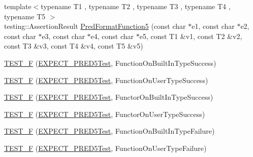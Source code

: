 \begin{DoxyCompactItemize}
{\footnotesize template$<$typename T1 , typename T2 , typename T3 , typename T4 , typename T5 $>$ }\\testing\+::\+Assertion\+Result \mbox{\hyperlink{googletest-master_2googletest_2test_2gtest__pred__impl__unittest_8cc_a09cbd3b6651151c3b97a890d28bdb75f}{Pred\+Format\+Function5}} (const char $\ast$e1, const char $\ast$e2, const char $\ast$e3, const char $\ast$e4, const char $\ast$e5, const T1 \&v1, const T2 \&v2, const T3 \&v3, const T4 \&v4, const T5 \&v5)
\item 
\mbox{\hyperlink{googletest-master_2googletest_2test_2gtest__pred__impl__unittest_8cc_a1b36f70a595ae4a209741df2a62002c3}{T\+E\+S\+T\+\_\+F}} (\mbox{\hyperlink{googletest-master_2googletest_2test_2gtest__pred__impl__unittest_8cc_a9e7ab56ee0997fdc5c9f7318d0f1094c}{E\+X\+P\+E\+C\+T\+\_\+\+P\+R\+E\+D5\+Test}}, Function\+On\+Built\+In\+Type\+Success)
\item 
\mbox{\hyperlink{googletest-master_2googletest_2test_2gtest__pred__impl__unittest_8cc_a2d0901e19bffadc3482d9116cd590eb0}{T\+E\+S\+T\+\_\+F}} (\mbox{\hyperlink{googletest-master_2googletest_2test_2gtest__pred__impl__unittest_8cc_a9e7ab56ee0997fdc5c9f7318d0f1094c}{E\+X\+P\+E\+C\+T\+\_\+\+P\+R\+E\+D5\+Test}}, Function\+On\+User\+Type\+Success)
\item 
\mbox{\hyperlink{googletest-master_2googletest_2test_2gtest__pred__impl__unittest_8cc_a1b7aaebfa64a21ec7a7cdd0a4258108d}{T\+E\+S\+T\+\_\+F}} (\mbox{\hyperlink{googletest-master_2googletest_2test_2gtest__pred__impl__unittest_8cc_a9e7ab56ee0997fdc5c9f7318d0f1094c}{E\+X\+P\+E\+C\+T\+\_\+\+P\+R\+E\+D5\+Test}}, Functor\+On\+Built\+In\+Type\+Success)
\item 
\mbox{\hyperlink{googletest-master_2googletest_2test_2gtest__pred__impl__unittest_8cc_a4afff8ae16f447497e2d682ab8835470}{T\+E\+S\+T\+\_\+F}} (\mbox{\hyperlink{googletest-master_2googletest_2test_2gtest__pred__impl__unittest_8cc_a9e7ab56ee0997fdc5c9f7318d0f1094c}{E\+X\+P\+E\+C\+T\+\_\+\+P\+R\+E\+D5\+Test}}, Functor\+On\+User\+Type\+Success)
\item 
\mbox{\hyperlink{googletest-master_2googletest_2test_2gtest__pred__impl__unittest_8cc_a9f91ab913ee8017bc5e837cc34e30ae8}{T\+E\+S\+T\+\_\+F}} (\mbox{\hyperlink{googletest-master_2googletest_2test_2gtest__pred__impl__unittest_8cc_a9e7ab56ee0997fdc5c9f7318d0f1094c}{E\+X\+P\+E\+C\+T\+\_\+\+P\+R\+E\+D5\+Test}}, Function\+On\+Built\+In\+Type\+Failure)
\item 
\mbox{\hyperlink{googletest-master_2googletest_2test_2gtest__pred__impl__unittest_8cc_a6188c218f102846ec55e25fcd29c1e8e}{T\+E\+S\+T\+\_\+F}} (\mbox{\hyperlink{googletest-master_2googletest_2test_2gtest__pred__impl__unittest_8cc_a9e7ab56ee0997fdc5c9f7318d0f1094c}{E\+X\+P\+E\+C\+T\+\_\+\+P\+R\+E\+D5\+Test}}, Function\+On\+User\+Type\+Failure)

\end{DoxyCompactItemize}
